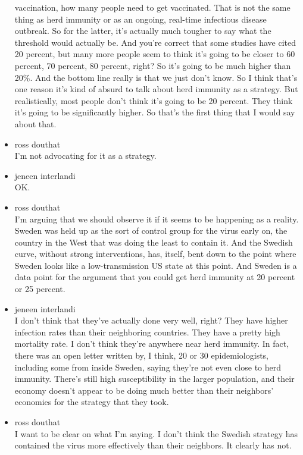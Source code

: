\begin{itemize}
  vaccination, how many people need to get vaccinated. That is not the
  same thing as herd immunity or as an ongoing, real-time infectious
  disease outbreak. So for the latter, it's actually much tougher to say
  what the threshold would actually be. And you're correct that some
  studies have cited 20 percent, but many more people seem to think it's
  going to be closer to 60 percent, 70 percent, 80 percent, right? So
  it's going to be much higher than 20\%. And the bottom line really is
  that we just don't know. So I think that's one reason it's kind of
  absurd to talk about herd immunity as a strategy. But realistically,
  most people don't think it's going to be 20 percent. They think it's
  going to be significantly higher. So that's the first thing that I
  would say about that.
\item
  ross douthat\\
  I'm not advocating for it as a strategy.
\item
  jeneen interlandi\\
  OK.
\item
  ross douthat\\
  I'm arguing that we should observe it if it seems to be happening as a
  reality. Sweden was held up as the sort of control group for the virus
  early on, the country in the West that was doing the least to contain
  it. And the Swedish curve, without strong interventions, has, itself,
  bent down to the point where Sweden looks like a low-transmission US
  state at this point. And Sweden is a data point for the argument that
  you could get herd immunity at 20 percent or 25 percent.
\item
  jeneen interlandi\\
  I don't think that they've actually done very well, right? They have
  higher infection rates than their neighboring countries. They have a
  pretty high mortality rate. I don't think they're anywhere near herd
  immunity. In fact, there was an open letter written by, I think, 20 or
  30 epidemiologists, including some from inside Sweden, saying they're
  not even close to herd immunity. There's still high susceptibility in
  the larger population, and their economy doesn't appear to be doing
  much better than their neighbors' economies for the strategy that they
  took.
\item
  ross douthat\\
  I want to be clear on what I'm saying. I don't think the Swedish
  strategy has contained the virus more effectively than their
  neighbors. It clearly has not.

\end{itemize}
